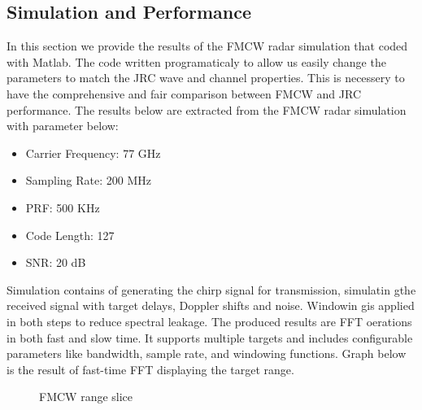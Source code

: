 \documentclass[conference]{IEEEtran}
\begin{document}
	\subsection {Simulation and Performance}

In this section we provide the results of the FMCW radar simulation that coded with Matlab. The code written programaticaly to allow us easily change the parameters to match the JRC wave and channel properties. This is necessery to have the comprehensive and fair comparison between FMCW and JRC performance. 
The results below are extracted from the FMCW  radar simulation with parameter below:
	\begin{itemize}
	\item Carrier Frequency:	77 GHz
	\item Sampling Rate:		200 MHz
	\item PRF:				500 KHz
	\item Code Length:		127
	\item SNR:				20 dB
	\end{itemize}
	
Simulation contains of generating the chirp signal for transmission, simulatin gthe received signal with target delays, Doppler shifts and noise. Windowin gis applied in both steps to reduce spectral leakage. The produced results are  FFT oerations in both fast and slow time. It supports multiple targets and includes configurable parameters like bandwidth, sample rate, and windowing functions. Graph below is the result of fast-time FFT displaying the target range.

	\begin{figure}[H]
	    		\centering
	    		\caption{FMCW range slice}
		\end{figure}
\end{document}
